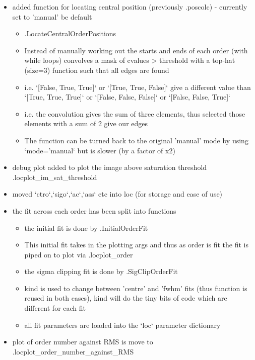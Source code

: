 \begin{itemize}
\item added function for locating central position (previously \spirouLOCOR.poscolc) - currently set to 'manual' be default
    \begin{itemize}
    \item \spirouLOCOR.LocateCentralOrderPositions
    \item  Instead of manually working out the starts and ends of each order (with while loops) convolves a mask of cvalues > threshold with a top-hat (size=3) function such that all edges are found
    \item i.e. `[False, True, True]` or `[True, True, False]` give a different value than `[True, True, True]` or `[False, False, False]` or `[False, False, True]`
    \item i.e. the convolution gives the sum of three elements, thus selected those elements with a sum of 2 give our edges
    \item The function can be turned back to the original 'manual' mode by using `mode='manual` but is slower (by a factor of x2)
	\end{itemize}

\item debug plot added to plot the image above saturation threshold \spirouPlot.locplot\_im\_sat\_threshold
        
\item moved `ctro`,`sigo`,`ac`,`ass` etc into loc (for storage and ease of use)        
        
\item the fit across each order has been split into functions
    \begin{itemize}
	\item the initial fit is done by \spirouLOCOR.InitialOrderFit
	\item This initial fit takes in the plotting args and thus as order is fit the fit is piped on to plot via \spirouPlot.locplot\_order
	\item the sigma clipping fit is done by \spirouLOCOR.SigClipOrderFit
	\item kind is used to change between 'centre' and 'fwhm' fits (thus function is reused in both cases), kind will do the tiny bits of code which are different for each fit
	\item all fit parameters are loaded into the `loc` parameter dictionary
	\end{itemize}

\item plot of order number against RMS is move to \spirouPlot.locplot\_order{\hskip 0pt}\_number\_against\_RMS


\end{itemize}
